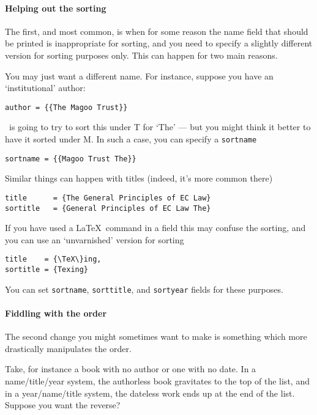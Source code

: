 \paragraph{Helping out the sorting}\label{sorting:sortname} The first,
and most common, is when for some reason the name field that should be
printed is inappropriate for sorting, and you need to specify a
slightly different version for sorting purposes only. This can happen
for two main reasons.

You may just want a different name. For instance, suppose you have an
`institutional' author:
\begin{Verbatim}
author = {{The Magoo Trust}}
\end{Verbatim}
\biblatex\ is going to try to sort this under T for `The' --- but you
might think it better to have it sorted under M. In such a case, you
can specify a \texttt{sortname}
\begin{Verbatim}
sortname = {{Magoo Trust The}}
\end{Verbatim}

Similar things can happen with titles (indeed, it's more common
there)\label{sorting:sorttitle}
\begin{Verbatim}
title      = {The General Principles of EC Law}
sortitle   = {General Principles of EC Law The}
\end{Verbatim}

If you have used a \LaTeX\ command in a field this may confuse the
sorting, and you can use an `unvarnished' version for sorting
\begin{Verbatim}
title    = {\TeX\}ing,
sortitle = {Texing}
\end{Verbatim}

You can set \texttt{sortname}, \texttt{sorttitle}, and \texttt{sortyear}
fields for these purposes.

\paragraph{Fiddling with the order} The second change you might sometimes
want to make is something which more drastically manipulates the order.

Take, for instance a book with no author or one with no date. In a
name/title/year system, the authorless book gravitates to the top of
the list, and in a year/name/title system, the dateless work ends up
at the end of the list. Suppose you want the reverse?

